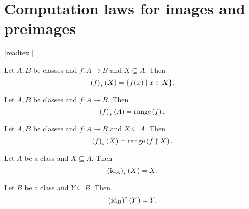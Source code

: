 \documentclass[../../set-theory/set-theory.tex]{subfiles}
\begin{document}
  \chapter{Computation laws for images and preimages}\label{chapter:image-and-preimage}


  \begin{forthel}

    [readtex ]

  \end{forthel}

  \begin{forthel}
    \begin{proposition}
      Let $A, B$ be classes and $f : A \to B$ and $X \subseteq A$.
      Then \[ \left(f\right)_{*}(X) = \{ f(x) \mid x \in X \}. \]
    \end{proposition}
  \end{forthel}

  \begin{forthel}
    \begin{corollary}
      Let $A, B$ be classes and $f : A \to B$.
      Then \[ \left(f\right)_{*}(A) = \mathrm{range}\left(f\right). \]
    \end{corollary}
  \end{forthel}

  \begin{forthel}
    \begin{corollary}
      Let $A, B$ be classes and $f : A \to B$ and $X \subseteq A$.
      Then \[ \left(f\right)_{*}(X) = \mathrm{range}\left(f \restriction X\right). \]
    \end{corollary}
  \end{forthel}

  \begin{forthel}
    \begin{proposition}
      Let $A$ be a class and $X \subseteq A$.
      Then \[ \left(\mathrm{id}_{A}\right)_{*}(X) = X. \]
    \end{proposition}
  \end{forthel}

  \begin{forthel}
    \begin{proposition}
      Let $B$ be a class and $Y \subseteq B$.
      Then \[ \left(\mathrm{id}_{B}\right)^{*}(Y) = Y. \]
    \end{proposition}
  \end{forthel}
\end{document}
